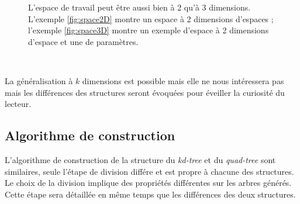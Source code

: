 	\begin{figure}[h]
		\centering
		\hspace{5pt}
		\caption[Espace de travail à 2 ou 3 dimensions]{L'espace de travail peut être aussi bien à 2 qu'à 3 dimensions. L'exemple \ref{fig:space2D} montre un espace à 2 dimensions d'espaces ; l'exemple \ref{fig:space3D} montre un exemple d'espace à 2 dimensions d'espace et une de paramètres.}
		\label{fig:algoparsec}
	\end{figure}

\

La généralisation à $k$ dimensions est possible mais elle ne nous intéressera pas mais les différences des structures seront évoquées pour éveiller la curiosité du lecteur.

	\subsection{Algorithme de construction}

L'algorithme de construction de la structure du \emph{kd-tree} et du \emph{quad-tree} sont similaires, seule l'étape de division différe et est propre à chacune des structures. Le choix de la division implique des propriétés différentes sur les arbres générés. Cette étape sera détaillée en même temps que les différences des deux structures.

